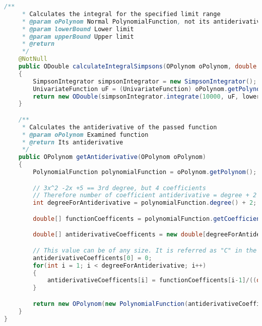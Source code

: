 \begin{lstlisting}[caption=Integral (Istogu),label=list:Integral,language=Java]
    /**
     * Calculates the integral for the specified limit range
     * @param oPolynom Normal PolynomialFunction, not its antiderivative
     * @param lowerBound Lower limit
     * @param upperBound Upper limit
     * @return
     */
    @NotNull
    public ODouble calculateIntegralSimpsons(OPolynom oPolynom, double lowerBound, double upperBound)
    {
        SimpsonIntegrator simpsonIntegrator = new SimpsonIntegrator();
        UnivariateFunction uF = (UnivariateFunction) oPolynom.getPolynom();
        return new ODouble(simpsonIntegrator.integrate(10000, uF, lowerBound, upperBound));
    }

    /**
     * Calculates the antiderivative of the passed function
     * @param oPolynom Examined function
     * @return Its antiderivative
     */
    public OPolynom getAntiderivative(OPolynom oPolynom)
    {
        PolynomialFunction polynomialFunction = oPolynom.getPolynom();

        // 3x^2 -2x +5 == 3rd degree, but 4 coefficients
        // Therefore number of coefficient antiderivative = degree + 2
        int degreeForAntiderivative = polynomialFunction.degree() + 2;

        double[] functionCoefficents = polynomialFunction.getCoefficients();

        double[] antiderivativeCoefficents = new double[degreeForAntiderivative];

        // This value can be of any size. It is referred as "C" in the literature.
        antiderivativeCoefficents[0] = 0;
        for(int i = 1; i < degreeForAntiderivative; i++)
        {
            antiderivativeCoefficents[i] = functionCoefficents[i-1]/((double) i);
        }

        return new OPolynom(new PolynomialFunction(antiderivativeCoefficents));
    }
}
\end{lstlisting}    

